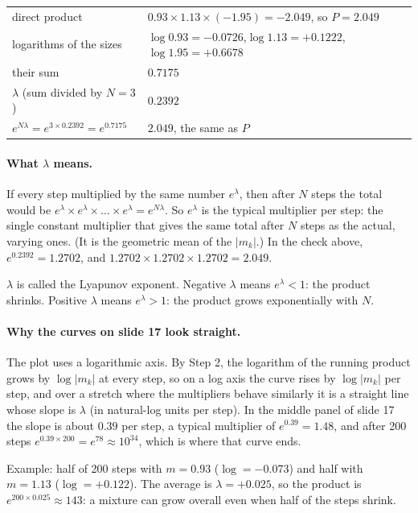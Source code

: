 \documentclass[11pt]{article}
\begin{document}
\begin{center}
\begin{tabular}{ll}
\toprule
direct product & $0.93\times1.13\times(-1.95)=-2.049$, so $P=2.049$ \\
logarithms of the sizes & $\log0.93=-0.0726$,\quad $\log1.13=+0.1222$,\quad $\log1.95=+0.6678$ \\
their sum & $0.7175$ \\
$\lambda$ (sum divided by $N=3$) & $0.2392$ \\
$e^{N\lambda}=e^{3\times0.2392}=e^{0.7175}$ & $2.049$, the same as $P$ \\
\bottomrule
\end{tabular}
\end{center}

\paragraph{What $\lambda$ means.} If every step multiplied by the same number $e^\lambda$, then after $N$ steps the total would be $e^\lambda\times e^\lambda\times\dots\times e^\lambda=e^{N\lambda}$. So $e^\lambda$ is the typical multiplier per step: the single constant multiplier that gives the same total after $N$ steps as the actual, varying ones. (It is the geometric mean of the $|m_k|$.) In the check above, $e^{0.2392}=1.2702$, and $1.2702\times1.2702\times1.2702=2.049$.

$\lambda$ is called the Lyapunov exponent. Negative $\lambda$ means $e^\lambda<1$: the product shrinks. Positive $\lambda$ means $e^\lambda>1$: the product grows exponentially with $N$.

\paragraph{Why the curves on slide 17 look straight.} The plot uses a logarithmic axis. By Step 2, the logarithm of the running product grows by $\log|m_k|$ at every step, so on a log axis the curve rises by $\log|m_k|$ per step, and over a stretch where the multipliers behave similarly it is a straight line whose slope is $\lambda$ (in natural-log units per step). In the middle panel of slide 17 the slope is about $0.39$ per step, a typical multiplier of $e^{0.39}=1.48$, and after 200 steps $e^{0.39\times200}=e^{78}\approx10^{34}$, which is where that curve ends.

Example: half of 200 steps with $m=0.93$ ($\log=-0.073$) and half with $m=1.13$ ($\log=+0.122$). The average is $\lambda=+0.025$, so the product is $e^{200\times0.025}\approx143$: a mixture can grow overall even when half of the steps shrink.
\end{document}
